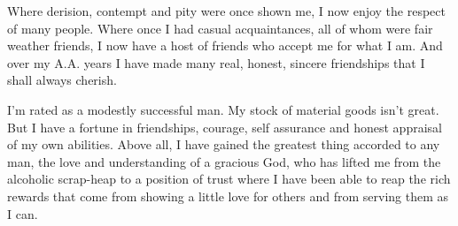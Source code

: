       Where derision, contempt and pity were once shown me, I now enjoy the respect of many people. Where once I had casual acquaintances, all of whom were fair weather friends, I now have a host of friends who accept me for what I am. And over my A.A. years I have made many real, honest, sincere friendships that I shall always cherish.

I’m rated as a modestly successful man. My stock of material goods isn’t great. But I have a fortune in friendships, courage, self assurance and honest appraisal of my own abilities. Above all, I have gained the greatest thing accorded to any man, the love and understanding of a gracious God, who has lifted me from the alcoholic scrap-heap to a position of trust where I have been able to reap the rich rewards that come from showing a little love for others and from serving them as I can.
